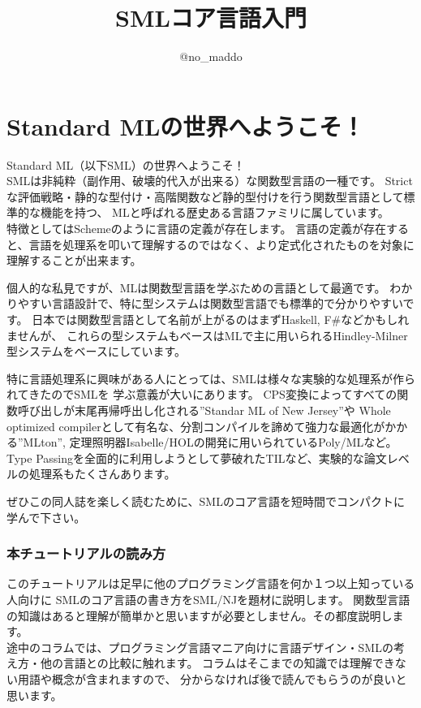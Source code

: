 \documentclass[11pt,a4paper]{article}
\title{SMLコア言語入門}
\author{@no\_maddo}
\begin{document}
\maketitle
\tableofcontents

\setlength{\parskip}{0.1cm}


\part{Standard MLの世界へようこそ！}
Standard ML（以下SML）の世界へようこそ！\\
SMLは非純粋（副作用、破壊的代入が出来る）な関数型言語の一種です。
Strictな評価戦略・静的な型付け・高階関数など静的型付けを行う関数型言語として標準的な機能を持つ、
MLと呼ばれる歴史ある言語ファミリに属しています。\\
特徴としてはSchemeのように言語の定義が存在します\cite{definition}。
言語の定義が存在すると、言語を処理系を叩いて理解するのではなく、より定式化されたものを対象に理解することが出来ます。

個人的な私見ですが、MLは関数型言語を学ぶための言語として最適です。
わかりやすい言語設計で、特に型システムは関数型言語でも標準的で分かりやすいです。
日本では関数型言語として名前が上がるのはまずHaskell, F\#などかもしれませんが、
これらの型システムもベースはMLで主に用いられるHindley-Milner型システムをベースにしています。

特に言語処理系に興味がある人にとっては、SMLは様々な実験的な処理系が作られてきたのでSMLを
学ぶ意義が大いにあります。
CPS変換によってすべての関数呼び出しが末尾再帰呼出し化される''Standar ML of New Jersey''や
Whole optimized compilerとして有名な、分割コンパイルを諦めて強力な最適化がかかる''MLton'',
定理照明器Isabelle/HOLの開発に用いられているPoly/MLなど。
Type Passingを全面的に利用しようとして夢破れたTILなど、実験的な論文レベルの処理系もたくさんあります。

ぜひこの同人誌を楽しく読むために、SMLのコア言語を短時間でコンパクトに学んで下さい。

\section{本チュートリアルの読み方}
このチュートリアルは足早に他のプログラミング言語を何か１つ以上知っている人向けに
SMLのコア言語の書き方をSML/NJを題材に説明します。
関数型言語の知識はあると理解が簡単かと思いますが必要としません。その都度説明します。\\
途中のコラムでは、プログラミング言語マニア向けに言語デザイン・SMLの考え方・他の言語との比較に触れます。
コラムはそこまでの知識では理解できない用語や概念が含まれますので、
分からなければ後で読んでもらうのが良いと思います。
\end{document}
